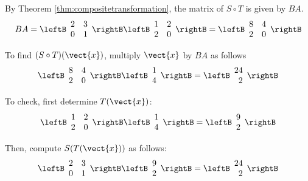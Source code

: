 \begin{solution}
By Theorem \ref{thm:compositetransformation}, the matrix of $S \circ T$ is given by $BA$. 
\[
BA 
=
\leftB
\begin{array}{rr}
2 & 3 \\
0 & 1
\end{array}
\rightB
\leftB
\begin{array}{rr}
1 & 2 \\
2 & 0 
\end{array}
\rightB
 =
\leftB
\begin{array}{rr}
8 & 4 \\
2 & 0
\end{array}
\rightB
\]

To find $(S \circ T)(\vect{x})$, multiply $\vect{x}$ by $BA$ as follows
\[
\leftB
\begin{array}{rr}
8 & 4 \\
2 & 0
\end{array}
\rightB
\leftB
\begin{array}{rr}
1 \\
4
\end{array}
\rightB
=
\leftB
\begin{array}{r}
24 \\
2
\end{array}
\rightB
\]

To check, first determine $T(\vect{x})$:
\[
\leftB
\begin{array}{rr}
1 & 2 \\
2 & 0 
\end{array}
\rightB
\leftB
\begin{array}{r}
1 \\
4
\end{array}
\rightB
=
\leftB
\begin{array}{r}
9 \\
2
\end{array}
\rightB
\]

Then, compute $S(T(\vect{x}))$ as follows:
\[
\leftB
\begin{array}{rr}
2 & 3 \\
0 & 1 
\end{array}
\rightB
\leftB
\begin{array}{r}
9 \\
2
\end{array}
\rightB
=
\leftB
\begin{array}{r}
24 \\
2
\end{array}
\rightB
\]
\end{solution}

